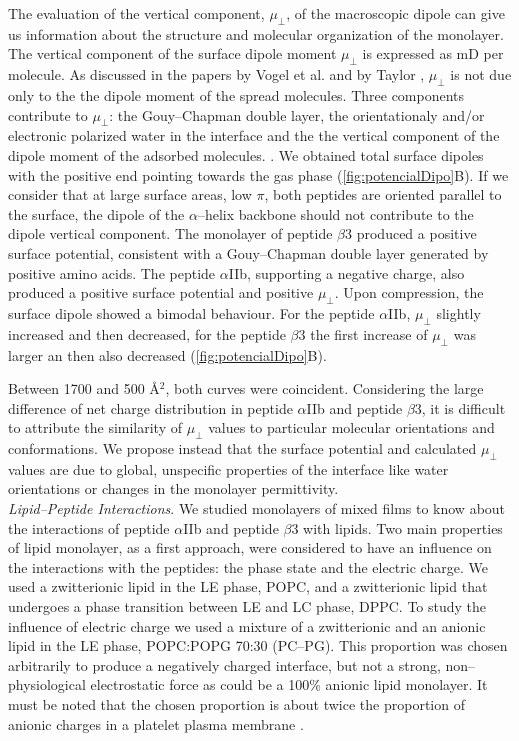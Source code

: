 \documentclass[journal=jacsat,manuscript=article]{achemso}
\begin{document}
The evaluation of the vertical component, $\mu_\perp$, of the macroscopic dipole can give us information about the structure and molecular organization of the monolayer. The vertical component of the surface dipole moment $\mu_\perp$ is expressed as mD per molecule. As discussed in the papers by Vogel et al.\cite{Vogel1988} and by Taylor \cite{Taylor1994}, $\mu_\perp$ is not due only to the the dipole moment of the spread molecules. Three components contribute to $\mu_\perp$: the Gouy–Chapman double layer, the orientationaly and/or electronic polarized water in the interface and the the vertical component of the dipole moment of the adsorbed molecules. \cite{Brockman1994}. We obtained total surface dipoles with the positive end pointing towards the gas phase (\autoref{fig:potencialDipo}B). If we consider that at large surface areas, low $\pi$, both peptides are oriented parallel to the surface, the dipole of the $\alpha$–helix backbone should not contribute to the dipole vertical component. The monolayer of peptide $\beta$3 produced a positive surface potential, consistent with a Gouy–Chapman double layer generated by positive amino acids. The peptide $\alpha$IIb, supporting a negative charge, also produced a positive surface potential and positive $\mu_\perp$. Upon compression, the surface dipole showed a bimodal behaviour. For the peptide $\alpha$IIb, $\mu_\perp$ slightly increased and then decreased, for the peptide $\beta$3 the first increase of $\mu_\perp$ was larger an then also decreased (\autoref{fig:potencialDipo}B). 

Between 1700 and 500 Å$^2$, both curves were coincident. Considering the large difference of net charge distribution in peptide $\alpha$IIb and peptide $\beta$3, it is difficult to attribute the similarity of $\mu_\perp$ values to particular molecular orientations and conformations. We propose instead that the surface potential and calculated $\mu_\perp$ values are due to global, unspecific properties of the interface like water orientations or changes in the monolayer permittivity.\\


\noindent \textit{Lipid–Peptide Interactions}. 
We studied monolayers of mixed films to know about the interactions of peptide $\alpha$IIb and peptide $\beta$3 with lipids. Two main properties of lipid monolayer, as a first approach, were considered to have an influence on the interactions with the peptides: the phase state and the electric charge. We used a zwitterionic lipid in the LE phase, POPC, and a zwitterionic lipid that undergoes a phase transition between LE and LC phase, DPPC. To study the influence of electric charge we used a mixture of a zwitterionic and an anionic lipid in the LE phase, POPC:POPG 70:30 (PC–PG). This proportion was chosen arbitrarily to produce a negatively charged interface, but not a strong, non–physiological electrostatic force as could be a 100\% anionic lipid monolayer. It must be noted that the chosen proportion is about twice the proportion of anionic charges in a platelet plasma membrane \cite{1996_Garcia}.
\end{document}
